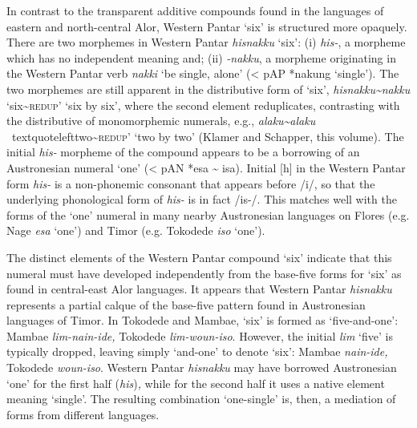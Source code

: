 In contrast to the transparent additive compounds found in the languages of eastern and north-central Alor, Western Pantar {\textquoteleft}six{\textquoteright} is structured more opaquely. There are two morphemes in Western Pantar \textit{hisnakku}\textit{{\ng}}\textit{ }{\textquoteleft}six{\textquoteright}: (i) \textit{his-}, a morpheme which has no independent meaning and; (ii) \textit{{}-nakku}\textit{{\ng}}, a morpheme originating in the Western Pantar verb \textit{nakki}\textit{{\ng}} {\textquoteleft}be single, alone{\textquoteright} ({\textless} pAP *nakung {\textquoteleft}single{\textquoteright}). The two morphemes are still apparent in the distributive form of {\textquoteleft}six{\textquoteright}, \textit{hisnakku}\textit{{\ng}}\textit{\~{}nakku}\textit{{\ng}} {\textquoteleft}six\~{}\textsc{redup}{\textquoteright} {\textquoteleft}six by six{\textquoteright}, where the second element reduplicates, contrasting with the distributive of monomorphemic numerals, e.g., \textit{alaku\~{}alaku }{\
textquoteleft}two\~{}\textsc{redup}{\textquoteright} {\textquoteleft}two by two{\textquoteright} (Klamer and Schapper, this volume). The initial \textit{his-} morpheme of the compound appears to be a borrowing of an Austronesian numeral {\textquoteleft}one{\textquoteright} ({\textless} pAN *esa \~{} isa). Initial [h] in the Western Pantar form \textit{his-} is a non-phonemic consonant that appears before /i/, so that the underlying phonological form of \textit{his-} is in fact /is-/. This matches well with the forms of the {\textquoteleft}one{\textquoteright} numeral in many nearby Austronesian languages on Flores (e.g. Nage \textit{esa} {\textquoteleft}one{\textquoteright}) and Timor (e.g. Tokodede \textit{iso} {\textquoteleft}one{\textquoteright}). 

The distinct elements of the Western Pantar compound {\textquoteleft}six{\textquoteright} indicate that this numeral must have developed independently from the base-five forms for {\textquoteleft}six{\textquoteright} as found in central-east Alor languages. It appears that Western Pantar \textit{hisnakku}\textit{{\ng}} represents a partial calque of the base-five pattern found in Austronesian languages of Timor. In Tokodede and Mambae, {\textquoteleft}six{\textquoteright} is formed as {\textquoteleft}five-and-one{\textquoteright}: Mambae \textit{lim-nain-ide, }Tokodede \textit{lim-woun-iso}. However, the initial \textit{lim} {\textquoteleft}five{\textquoteright} is typically dropped, leaving simply {\textquoteleft}and-one{\textquoteright} to denote {\textquoteleft}six{\textquoteright}: Mambae \textit{nain-ide, }Tokodede \textit{woun-iso}. Western Pantar \textit{hisnakku}\textit{{\ng}} may have borrowed Austronesian {\textquoteleft}one{\textquoteright} for the first half (\textit{his})\textit{, }while for the 
second half it uses a native element meaning {\textquoteleft}single{\textquoteright}. The resulting combination {\textquoteleft}one-single{\textquoteright} is, then, a mediation of forms from different languages.

